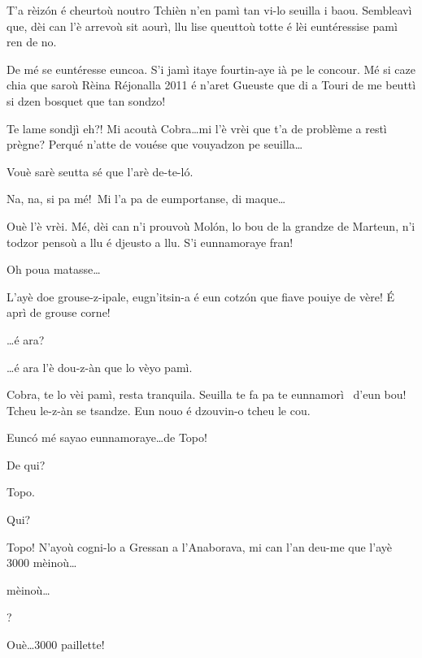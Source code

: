 \begin{drama}
\Tzardounspeaks T’a rèiz\'on é cheurtoù noutro Tchièn n’en pamì tan vi-lo seuilla i baou. Sembleavì que, dèi can l'è arrevoù sit aourì, llu lise queuttoù totte é lèi euntéressise pamì ren de no.

\Cobraspeaks De mé se euntéresse euncoa. S’i jamì itaye fourtin-aye ià pe le concour. Mé si caze chia que saroù Rèina Réjonalla 2011 é n’aret Gueuste que di a Touri de me beuttì si dzen bosquet que tan sondzo!

\Tzardounspeaks Te lame sondjì eh?!  Mi acoutà Cobra\ldots mi l’è vrèi que t’a de problème a restì prègne? Perqué n’atte de vouése que vouyadzon pe seuilla\ldots


\Cobraspeaks Vouè sarè seutta sé que l’arè de-te-l\'o.

\Piccinaspeaks Na, na, si pa mé!\imbarazzatoo\ Mi l’a pa de eumportanse, di maque\ldots

\Cobraspeaks Ouè l’è vrèi. Mé, dèi can n’i prouvoù Mol\'on, lo bou de la grandze de Marteun, n’i todzor pensoù a llu é djeusto a llu. S’i eunnamoraye fran!

\Piccinaspeaks Oh poua matasse\ldots

\Cobraspeaks  L’ayè doe grouse-z-ipale, eugn'itsin-a é eun cotz\'on que fiave pouiye de vère! \'E aprì de grouse corne!

\Piccinaspeaks \ldots é ara?

\Cobraspeaks \ldots é ara l’è dou-z-àn que lo vèyo pamì.

\Tzardounspeaks Cobra, te lo vèi pamì, resta tranquila. Seuilla te fa pa te eunnamorì \inamourou\ d’eun bou! Tcheu le-z-àn se tsandze. Eun nouo é dzouvin-o tcheu le cou.

\Piccinaspeaks Eunc\'o mé sayao eunnamoraye\ldots de Topo!

\Tzardounspeaks De qui?

\Piccinaspeaks Topo.

\Tzardounspeaks Qui?

\Piccinaspeaks {} Topo! N’ayoù cogni-lo a Gressan a l’Anaborava, mi can l’an deu-me que l’ayè 3000 mèinoù\ldots

 mèinoù\ldots

?

\Piccinaspeaks Ouè\ldots 3000 paillette!


\end{drama}

